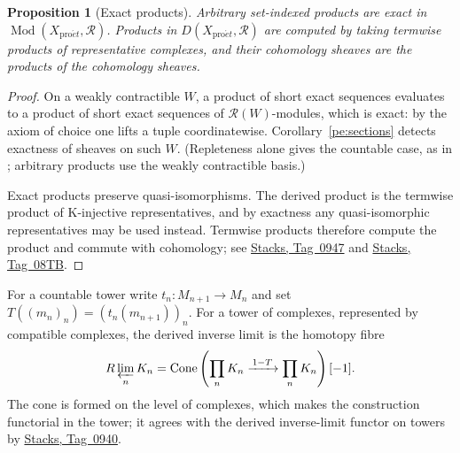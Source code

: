 \documentclass[11pt,a4paper]{article}
\numberwithin{equation}{section}
\newtheorem{proposition}[theorem]{Proposition}
\theoremstyle{definition}
\theoremstyle{remark}
\newcommand{\Mod}{\operatorname{Mod}}
\newcommand{\proet}{\mathrm{pro}\acute{e}t}
\newcommand{\stacks}[1]{\href{https://stacks.math.columbia.edu/tag/#1}{\textnormal{Stacks, Tag~#1}}}
\begin{document}
\begin{proposition}[Exact products]\label{pe:products}
Arbitrary set-indexed products are exact in
$\Mod(X_{\proet},\mathcal R)$. Products in
$D(X_{\proet},\mathcal R)$ are computed by taking termwise products
of representative complexes, and their cohomology sheaves are the
products of the cohomology sheaves.
\end{proposition}
\begin{proof}
On a weakly contractible $W$, a product of short exact sequences
evaluates to a product of short exact sequences of
$\mathcal R(W)$-modules, which is exact: by the axiom of choice one
lifts a tuple coordinatewise. Corollary~\ref{pe:sections} detects
exactness of sheaves on such $W$. (Repleteness alone gives the
countable case, as in \cite[\S3.1]{BS}; arbitrary products use the
weakly contractible basis.)

Exact products preserve quasi-isomorphisms. The derived product is
the termwise product of K-injective representatives, and by exactness
any quasi-isomorphic representatives may be used instead. Termwise
products therefore compute the product and commute with cohomology;
see \stacks{0947} and \stacks{08TB}.
\end{proof}

For a countable tower write $t_n:M_{n+1}\to M_n$ and set
$T((m_n)_n)=(t_n(m_{n+1}))_n$. For a tower of complexes, represented
by compatible complexes, the derived inverse limit is the homotopy
fibre
\begin{equation}\label{pe:rlim-cone}
 R\varprojlim_n K_n
 =
 \operatorname{Cone}\left(
  \prod_n K_n\xrightarrow{\,1-T\,}\prod_n K_n
 \right)[-1].
\end{equation}
The cone is formed on the level of complexes, which makes the
construction functorial in the tower; it agrees with the derived
inverse-limit functor on towers by \stacks{0940}.
\end{document}

